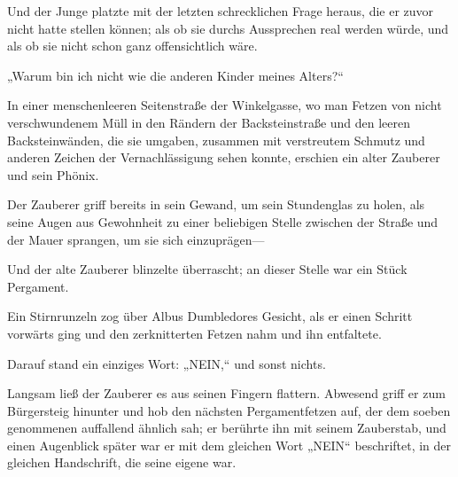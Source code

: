 Und der Junge platzte mit der letzten schrecklichen Frage heraus, die er zuvor nicht hatte stellen können; als ob sie durchs Aussprechen real werden würde, und als ob sie nicht schon ganz offensichtlich wäre.

„Warum bin ich nicht wie die anderen Kinder meines Alters?“

\later

In einer menschenleeren Seitenstraße der Winkelgasse, wo man Fetzen von nicht verschwundenem Müll in den Rändern der Backsteinstraße und den leeren Backsteinwänden, die sie umgaben, zusammen mit verstreutem Schmutz und anderen Zeichen der Vernachlässigung sehen konnte, erschien ein alter Zauberer und sein Phönix.

Der Zauberer griff bereits in sein Gewand, um sein Stundenglas zu holen, als seine Augen aus Gewohnheit zu einer beliebigen Stelle zwischen der Straße und der Mauer sprangen, um sie sich einzuprägen—

Und der alte Zauberer blinzelte überrascht; an dieser Stelle war ein Stück Pergament.

Ein Stirnrunzeln zog über Albus Dumbledores Gesicht, als er einen Schritt vorwärts ging und den zerknitterten Fetzen nahm und ihn entfaltete.

Darauf stand ein einziges Wort: „NEIN,“ und sonst nichts.

Langsam ließ der Zauberer es aus seinen Fingern flattern. Abwesend griff er zum Bürgersteig hinunter und hob den nächsten Pergamentfetzen auf, der dem soeben genommenen auffallend ähnlich sah; er berührte ihn mit seinem Zauberstab, und einen Augenblick später war er mit dem gleichen Wort „NEIN“ beschriftet, in der gleichen Handschrift, die seine eigene war.

